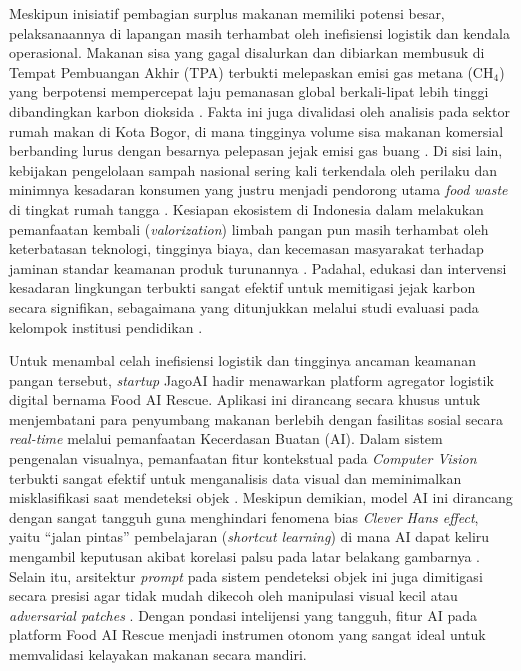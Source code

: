 Meskipun inisiatif pembagian surplus makanan memiliki potensi besar, pelaksanaannya di lapangan masih terhambat oleh inefisiensi logistik dan kendala operasional. Makanan sisa yang gagal disalurkan dan dibiarkan membusuk di Tempat Pembuangan Akhir (TPA) terbukti melepaskan emisi gas metana (CH$_4$) yang berpotensi mempercepat laju pemanasan global berkali-lipat lebih tinggi dibandingkan karbon dioksida \cite{alliffiyaalkhansyaharsyDampakLimbahMakanan2025c}. Fakta ini juga divalidasi oleh analisis pada sektor rumah makan di Kota Bogor, di mana tingginya volume sisa makanan komersial berbanding lurus dengan besarnya pelepasan jejak emisi gas buang \cite{fernandezCarbonFootprintAnalysis2024c}. Di sisi lain, kebijakan pengelolaan sampah nasional sering kali terkendala oleh perilaku dan minimnya kesadaran konsumen yang justru menjadi pendorong utama \textit{food waste} di tingkat rumah tangga \cite{lestariKebijakanPengelolaanSampah2022c}. Kesiapan ekosistem di Indonesia dalam melakukan pemanfaatan kembali (\textit{valorization}) limbah pangan pun masih terhambat oleh keterbatasan teknologi, tingginya biaya, dan kecemasan masyarakat terhadap jaminan standar keamanan produk turunannya \cite{immawanFoodWasteIndonesia2024a}. Padahal, edukasi dan intervensi kesadaran lingkungan terbukti sangat efektif untuk memitigasi jejak karbon secara signifikan, sebagaimana yang ditunjukkan melalui studi evaluasi pada kelompok institusi pendidikan \cite{qianFoodWasteAssociated2022a}.

Untuk menambal celah inefisiensi logistik dan tingginya ancaman keamanan pangan tersebut, \textit{startup} JagoAI hadir menawarkan platform agregator logistik digital bernama Food AI Rescue. Aplikasi ini dirancang secara khusus untuk menjembatani para penyumbang makanan berlebih dengan fasilitas sosial secara \textit{real-time} melalui pemanfaatan Kecerdasan Buatan (AI). Dalam sistem pengenalan visualnya, pemanfaatan fitur kontekstual pada \textit{Computer Vision} terbukti sangat efektif untuk menganalisis data visual dan meminimalkan misklasifikasi saat mendeteksi objek \cite{jamaliContextObjectDetection2025b}. Meskipun demikian, model AI ini dirancang dengan sangat tangguh guna menghindari fenomena bias \textit{Clever Hans effect}, yaitu ``jalan pintas'' pembelajaran (\textit{shortcut learning}) di mana AI dapat keliru mengambil keputusan akibat korelasi palsu pada latar belakang gambarnya \cite{pathakUnmaskingCleverHans2026a}. Selain itu, arsitektur \textit{prompt} pada sistem pendeteksi objek ini juga dimitigasi secara presisi agar tidak mudah dikecoh oleh manipulasi visual kecil atau \textit{adversarial patches} \cite{hopsonStudyAIObject2026b}. Dengan pondasi intelijensi yang tangguh, fitur AI pada platform Food AI Rescue menjadi instrumen otonom yang sangat ideal untuk memvalidasi kelayakan makanan secara mandiri.

